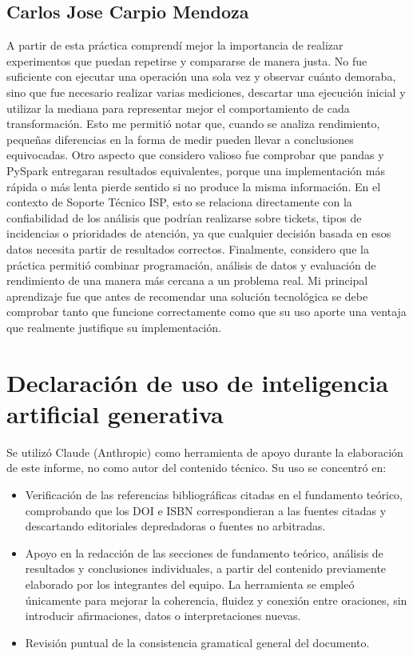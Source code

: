 \documentclass[11pt,a4paper]{article}
\begin{document}
    \subsection*{Carlos Jose Carpio Mendoza}

    A partir de esta práctica comprendí mejor la importancia de realizar experimentos que puedan repetirse y compararse de manera justa. No fue suficiente con ejecutar una operación una sola vez y observar cuánto demoraba, sino que fue necesario realizar varias mediciones, descartar una ejecución inicial y utilizar la mediana para representar mejor el comportamiento de cada transformación. Esto me permitió notar que, cuando se analiza rendimiento, pequeñas diferencias en la forma de medir pueden llevar a conclusiones equivocadas. Otro aspecto que considero valioso fue comprobar que pandas y PySpark entregaran resultados equivalentes, porque una implementación más rápida o más lenta pierde sentido si no produce la misma información. En el contexto de Soporte Técnico ISP, esto se relaciona directamente con la confiabilidad de los análisis que podrían realizarse sobre tickets, tipos de incidencias o prioridades de atención, ya que cualquier decisión basada en esos datos necesita partir de resultados correctos. Finalmente, considero que la práctica permitió combinar programación, análisis de datos y evaluación de rendimiento de una manera más cercana a un problema real. Mi principal aprendizaje fue que antes de recomendar una solución tecnológica se debe comprobar tanto que funcione correctamente como que su uso aporte una ventaja que realmente justifique su implementación.

    \newpage
    \printbibliography[title={Bibliografía}]

    \newpage

    \section*{Declaración de uso de inteligencia artificial generativa}

    Se utilizó Claude (Anthropic) como herramienta de apoyo durante la elaboración de este informe,
    no como autor del contenido técnico. Su uso se concentró en:

    \begin{itemize}[leftmargin=1.5em]
    \item Verificación de las referencias bibliográficas citadas en el fundamento teórico,
    comprobando que los DOI e ISBN correspondieran a las fuentes citadas y descartando
    editoriales depredadoras o fuentes no arbitradas.
    \item Apoyo en la redacción de las secciones de fundamento teórico, análisis de resultados
    y conclusiones individuales, a partir del contenido previamente elaborado por los
    integrantes del equipo. La herramienta se empleó únicamente para mejorar la coherencia,
    fluidez y conexión entre oraciones, sin introducir afirmaciones, datos o
    interpretaciones nuevas.
    \item Revisión puntual de la consistencia gramatical general del documento.
    \end{itemize}
\end{document}
